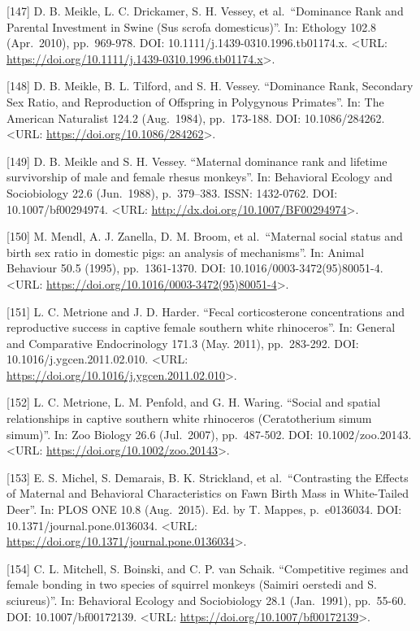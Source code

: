 \documentclass[
]{article}
\begin{document}
{[}147{]} D. B. Meikle, L. C. Drickamer, S. H. Vessey, et
al.~``Dominance Rank and Parental Investment in Swine (Sus scrofa
domesticus)''. In: Ethology 102.8 (Apr.~2010), pp.~969-978. DOI:
10.1111/j.1439-0310.1996.tb01174.x. \textless URL:
\url{https://doi.org/10.1111/j.1439-0310.1996.tb01174.x}\textgreater.

{[}148{]} D. B. Meikle, B. L. Tilford, and S. H. Vessey. ``Dominance
Rank, Secondary Sex Ratio, and Reproduction of Offspring in Polygynous
Primates''. In: The American Naturalist 124.2 (Aug.~1984), pp.~173-188.
DOI: 10.1086/284262. \textless URL:
\url{https://doi.org/10.1086/284262}\textgreater.

{[}149{]} D. B. Meikle and S. H. Vessey. ``Maternal dominance rank and
lifetime survivorship of male and female rhesus monkeys''. In:
Behavioral Ecology and Sociobiology 22.6 (Jun.~1988), p.~379--383. ISSN:
1432-0762. DOI: 10.1007/bf00294974. \textless URL:
\url{http://dx.doi.org/10.1007/BF00294974}\textgreater.

{[}150{]} M. Mendl, A. J. Zanella, D. M. Broom, et al.~``Maternal social
status and birth sex ratio in domestic pigs: an analysis of
mechanisms''. In: Animal Behaviour 50.5 (1995), pp.~1361-1370. DOI:
10.1016/0003-3472(95)80051-4. \textless URL:
\url{https://doi.org/10.1016/0003-3472(95)80051-4}\textgreater.

{[}151{]} L. C. Metrione and J. D. Harder. ``Fecal corticosterone
concentrations and reproductive success in captive female southern white
rhinoceros''. In: General and Comparative Endocrinology 171.3 (May.
2011), pp.~283-292. DOI: 10.1016/j.ygcen.2011.02.010. \textless URL:
\url{https://doi.org/10.1016/j.ygcen.2011.02.010}\textgreater.

{[}152{]} L. C. Metrione, L. M. Penfold, and G. H. Waring. ``Social and
spatial relationships in captive southern white rhinoceros
(Ceratotherium simum simum)''. In: Zoo Biology 26.6 (Jul.~2007),
pp.~487-502. DOI: 10.1002/zoo.20143. \textless URL:
\url{https://doi.org/10.1002/zoo.20143}\textgreater.

{[}153{]} E. S. Michel, S. Demarais, B. K. Strickland, et
al.~``Contrasting the Effects of Maternal and Behavioral Characteristics
on Fawn Birth Mass in White-Tailed Deer''. In: PLOS ONE 10.8
(Aug.~2015). Ed. by T. Mappes, p.~e0136034. DOI:
10.1371/journal.pone.0136034. \textless URL:
\url{https://doi.org/10.1371/journal.pone.0136034}\textgreater.

{[}154{]} C. L. Mitchell, S. Boinski, and C. P. van Schaik.
``Competitive regimes and female bonding in two species of squirrel
monkeys (Saimiri oerstedi and S. sciureus)''. In: Behavioral Ecology and
Sociobiology 28.1 (Jan.~1991), pp.~55-60. DOI: 10.1007/bf00172139.
\textless URL: \url{https://doi.org/10.1007/bf00172139}\textgreater.
\end{document}
